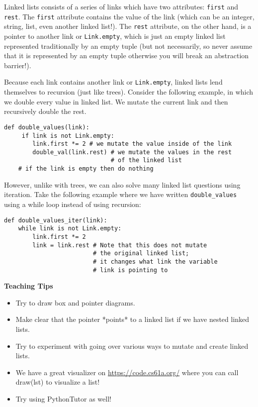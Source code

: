 \begin{blocksection}
Linked lists consists of a series of links which have two attributes: \lstinline{first} and \lstinline{rest}. The \lstinline{first} attribute contains the value of the link (which can be an integer, string, list, even another linked list!). The \lstinline{rest} attribute, on the other hand, is a pointer to another link or \lstinline{Link.empty}, which is just an empty linked list represented traditionally by an empty tuple (but not necessarily, so never assume that it is represented by an empty tuple otherwise you will break an abstraction barrier!).

Because each link contains another link or \lstinline{Link.empty}, linked lists lend themselves to recursion (just like trees). Consider the following example, in which we double every value in linked list. We mutate the current link and then recursively double the rest. 
\vspace{1.5mm}
\begin{lstlisting}
def double_values(link): 
     if link is not Link.empty:
        link.first *= 2 # we mutate the value inside of the link
        double_val(link.rest) # we mutate the values in the rest 
                              # of the linked list
    # if the link is empty then do nothing
\end{lstlisting}

However, unlike with trees, we can also solve many linked list questions using iteration. Take the following example where we have written \lstinline{double_values} using a while loop instead of using recursion:
\vspace{1.5mm}
\begin{lstlisting}
def double_values_iter(link):
    while link is not Link.empty:
        link.first *= 2
        link = link.rest # Note that this does not mutate 
                         # the original linked list; 
                         # it changes what link the variable 
                         # link is pointing to
\end{lstlisting}
\end{blocksection}

\begin{guide}
    \textbf{Teaching Tips}
    \begin{itemize}
       \item Try to draw box and pointer diagrams.
       \item Make clear that the pointer *points* to a linked list if we have nested linked lists.
       \item Try to experiment with going over various ways to mutate and create linked lists. 
       \item We have a great visualizer on \url{https://code.cs61a.org/} where you can call draw(lst) to visualize a list! 
       \item Try using PythonTutor as well!
    \end{itemize}
 \end{guide}